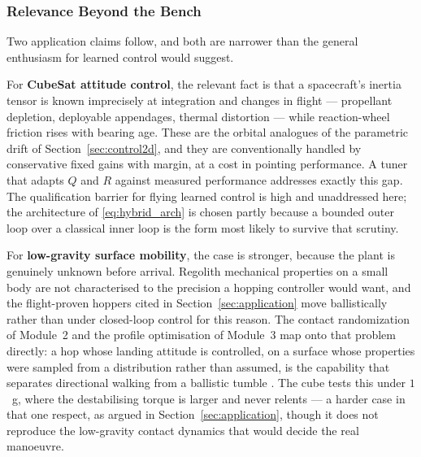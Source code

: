 \subsubsection{Relevance Beyond the Bench}

Two application claims follow, and both are narrower than the general
enthusiasm for learned control would suggest.

For \textbf{CubeSat attitude control}, the relevant fact is that a
spacecraft's inertia tensor is known imprecisely at integration and changes in
flight --- propellant depletion, deployable appendages, thermal distortion ---
while reaction-wheel friction rises with bearing age. These are the orbital
analogues of the parametric drift of Section~\ref{sec:control2d}, and they are
conventionally handled by conservative fixed gains with margin, at a cost in
pointing performance. A tuner that adapts $Q$ and $R$ against measured
performance addresses exactly this gap. The qualification barrier for flying
learned control is high and unaddressed here; the architecture of
\eqref{eq:hybrid_arch} is chosen partly because a bounded outer loop over a
classical inner loop is the form most likely to survive that scrutiny.

For \textbf{low-gravity surface mobility}, the case is stronger, because the
plant is genuinely unknown before arrival. Regolith mechanical properties on a
small body are not characterised to the precision a hopping controller would
want, and the flight-proven hoppers cited in Section~\ref{sec:application}
\cite{yoshimitsu1999minerva, ho2017mascot} move ballistically rather than
under closed-loop control for this reason. The contact randomization of
Module~2 and the profile optimisation of Module~3 map onto that problem
directly: a hop whose landing attitude is controlled, on a surface whose
properties were sampled from a distribution rather than assumed, is the
capability that separates directional walking from a ballistic tumble
\cite{spiridonov2024spacehopper}. The cube tests this under $1$~g, where the
destabilising torque is larger and never relents --- a harder case in that one
respect, as argued in Section~\ref{sec:application}, though it does not
reproduce the low-gravity contact dynamics that would decide the real
manoeuvre.


